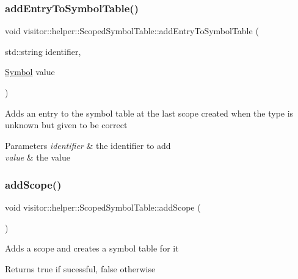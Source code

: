 \subsubsection{\texorpdfstring{add\+Entry\+To\+Symbol\+Table()}{addEntryToSymbolTable()}\hspace{0.1cm}{\footnotesize\ttfamily [7/7]}}
{\footnotesize\ttfamily void visitor\+::helper\+::\+Scoped\+Symbol\+Table\+::add\+Entry\+To\+Symbol\+Table (\begin{DoxyParamCaption}\item[{std\+::string}]{identifier,  }\item[{\hyperlink{structvisitor_1_1helper_1_1Symbol}{Symbol}}]{value }\end{DoxyParamCaption})}

Adds an entry to the symbol table at the last scope created when the type is unknown but given to be correct 
\begin{DoxyParams}{Parameters}
{\em identifier} & the identifier to add \\
\hline
{\em value} & the value \\
\hline
\end{DoxyParams}
\mbox{\label{classvisitor_1_1helper_1_1ScopedSymbolTable_a4938e3fb5c563484363538994a080be8}} 
\subsubsection{\texorpdfstring{add\+Scope()}{addScope()}}
{\footnotesize\ttfamily void visitor\+::helper\+::\+Scoped\+Symbol\+Table\+::add\+Scope (\begin{DoxyParamCaption}{ }\end{DoxyParamCaption})}

Adds a scope and creates a symbol table for it \begin{DoxyReturn}{Returns}
true if sucessful, false otherwise 
\end{DoxyReturn}
\mbox{\label{classvisitor_1_1helper_1_1ScopedSymbolTable_aaacddfaa8cb0843ba2821bd898270a1a}} 
